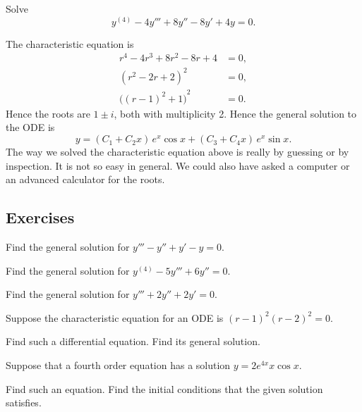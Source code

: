 \begin{example}
Solve
\begin{equation*}
y^{(4)} - 4 y''' + 8 y'' - 8 y' + 4y = 0 .
\end{equation*}

The characteristic equation is
\begin{align*}
r^4 - 4 r^3 + 8 r^2 - 8 r + 4 & = 0 , \\
{(r^2-2r+2)}^2 & = 0 , \\
{\bigl({(r-1)}^2+1\bigr)}^2 & = 0 .
\end{align*}
Hence the roots are $1 \pm i$, both with multiplicity 2.  Hence the general
solution to the ODE is
\begin{equation*}
y = 
( C_1 + C_2 x ) \, e^{x} \cos x
+
( C_3 + C_4 x ) \, e^{x} \sin x .
\end{equation*}
The way we solved the characteristic equation above is really by guessing or
by inspection.  It is not so easy in general.  We could also have asked
a computer or an advanced calculator for the roots.
\end{example}


\subsection{Exercises}

\begin{exercise}
Find the general solution for $y''' - y'' + y' - y = 0$.
\end{exercise}

\begin{exercise}
Find the general solution for $y^{(4)} - 5 y''' + 6 y'' = 0$.
\end{exercise}

\begin{exercise}
Find the general solution for $y''' + 2 y'' + 2 y' = 0$.
\end{exercise}

\begin{exercise}
Suppose the characteristic equation for an ODE is
${(r-1)}^2{(r-2)}^2 = 0$.
\begin{tasks}
\task
Find such a differential equation.
\task
Find its general solution.
\end{tasks}
\end{exercise}

\begin{exercise} \label{hol:eqfromsolex}
Suppose that a fourth order equation has a solution
$y = 2 e^{4x} x \cos x$.  
\begin{tasks}
\task
Find such an equation.
\task
Find the initial conditions that the given
solution satisfies.
\end{tasks}
\end{exercise}

